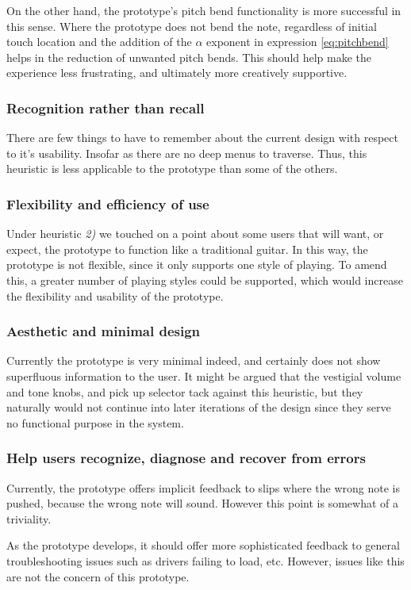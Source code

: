 On the other hand, the prototype's pitch bend functionality is more successful in this sense. Where the prototype does not bend the note, regardless of initial touch location and the addition of the $\alpha$ exponent in expression \ref{eq:pitchbend} helps in the reduction of unwanted pitch bends. This should help make the experience less frustrating, and ultimately more creatively supportive. 

\subsubsection{Recognition rather than recall}
There are few things to have to remember about the current design with respect to it's usability. Insofar as there are no deep menus to traverse. Thus, this heuristic is less applicable to the prototype than some of the others. 

\subsubsection{Flexibility and efficiency of use}
Under heuristic \textit{2)} we touched on a point about some users that will want, or expect, the prototype to function like a traditional guitar. In this way, the prototype is not flexible, since it only supports one style of playing. To amend this, a greater number of playing styles could be supported, which would increase the flexibility and usability of the prototype. 

\subsubsection{Aesthetic and minimal design}
Currently the prototype is very minimal indeed, and certainly does not show superfluous information to the user. It might be argued that the vestigial volume and tone knobs, and pick up selector tack against this heuristic, but they naturally would not continue into later iterations of the design since they serve no functional purpose in the system.

\subsubsection{Help users recognize, diagnose and recover from errors}
Currently, the prototype offers implicit feedback to slips where the wrong note is pushed, because the wrong note will sound. However this point is somewhat of a triviality.

As the prototype develops, it should offer more sophisticated feedback to general troubleshooting issues such as drivers failing to load, etc. However, issues like this are not the concern of this prototype. 

